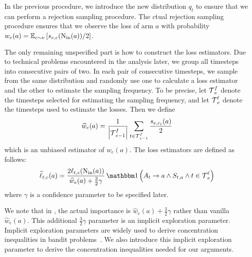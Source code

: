 In the previous procedure, we introduce the new distribution $q_t$ to ensure that we can perform a rejection sampling procedure. The ctual rejection sampling procedure ensures that we observe the loss of arm $a$ with probability $w_e(a)=\mathbb{E}_{c \sim \nu}\left[  s_{e,c}(\operatorname{N_{\text{in}}}(a))/2\right]$.


The only remaining unspecified part is how to construct the loss estimators.
%
Due to technical problems encountered in the analysis later, we group all timesteps into consecutive pairs of two. In each pair of consecutive timesteps, we sample from the same distribution and randomly use one to calculate a loss estimator and the other to estimate the sampling frequency.
%
To be precise, let $\operatorname{\mathcal{T}}_e^f$ denote the timesteps selected for estimating the sampling frequency, and let $\operatorname{\mathcal{T}}_e^{\ell}$ denote the timesteps used to estimate the losses. Then we define
$$
\widehat{w}_{e}(a)=\frac{1}{\left|\operatorname{\mathcal{T}}_{e-1}^f\right|} \sum_{t \in \operatorname{\mathcal{T}}_{e-1}^f} \frac{s_{e,c_t}(a)}{2}
$$
which is an unbiased estimator of $w_e(a)$. The loss estimators are defined as follows:
$$
\widehat{\ell}_{t,c}(a)=\frac{2 \ell_{t,c}(\NodeIn(a))}{\widehat{w}_{e}(a)+\frac{3}{2} \gamma} \indi\left(A_t \rightarrow a \wedge S_{t,a} \wedge t \in \Time_e^{\ell}\right)
$$
where $\gamma$ is a confidence parameter to be specified later.

We note that in , the actual importance is $\widehat{w}_e(a) + \frac{3}{2} \gamma$ rather than vanilla $\widehat{w}_e(a)$. This additional $\frac{3}{2} \gamma$ parameter is an implicit exploration parameter. Implicit exploration parameters are widely used to derive concentration inequalities in bandit problems~\citep{neu2015}. We also introduce this implicit exploration parameter to derive the concentration inequalities needed for our arguments.


